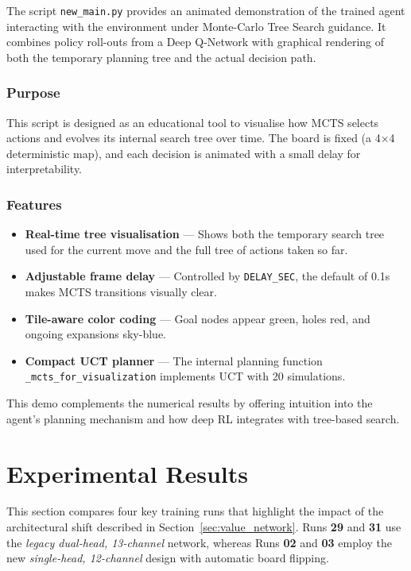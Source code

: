 \documentclass{report}
\begin{document}
The script \texttt{new\_main.py} provides an animated demonstration of the trained agent interacting with the environment under Monte-Carlo Tree Search guidance. It combines policy roll-outs from a Deep Q-Network with graphical rendering of both the temporary planning tree and the actual decision path.

\subsubsection*{Purpose}
This script is designed as an educational tool to visualise how MCTS selects actions and evolves its internal search tree over time. The board is fixed (a 4×4 deterministic map), and each decision is animated with a small delay for interpretability.

\subsubsection*{Features}
\begin{itemize}
  \item \textbf{Real-time tree visualisation} — Shows both the temporary search tree used for the current move and the full tree of actions taken so far.
  \item \textbf{Adjustable frame delay} — Controlled by \texttt{DELAY\_SEC}, the default of 0.1s makes MCTS transitions visually clear.
  \item \textbf{Tile-aware color coding} — Goal nodes appear green, holes red, and ongoing expansions sky-blue.
  \item \textbf{Compact UCT planner} — The internal planning function \texttt{\_mcts\_for\_visualization} implements UCT with 20 simulations.
\end{itemize}

\noindent This demo complements the numerical results by offering intuition into the agent’s planning mechanism and how deep RL integrates with tree-based search.

\newpage

\section{Experimental Results}
\label{sec:results}

This section compares four key training runs that highlight the impact of the
architectural shift described in Section~\ref{sec:value_network}.  
Runs \textbf{29} and \textbf{31} use the \emph{legacy dual-head, 13-channel}
network, whereas Runs \textbf{02} and \textbf{03} employ the new
\emph{single-head, 12-channel} design with automatic board flipping.
\end{document}

